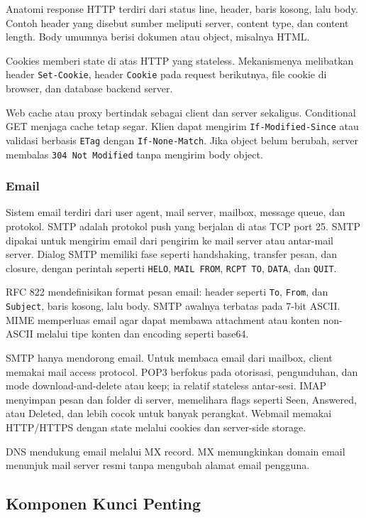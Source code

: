 Anatomi response HTTP terdiri dari status line, header, baris kosong, lalu body. Contoh header yang disebut sumber meliputi server, content type, dan content length. Body umumnya berisi dokumen atau object, misalnya HTML.

Cookies memberi state di atas HTTP yang stateless. Mekanismenya melibatkan header \texttt{Set-Cookie}, header \texttt{Cookie} pada request berikutnya, file cookie di browser, dan database backend server.

Web cache atau proxy bertindak sebagai client dan server sekaligus. Conditional GET menjaga cache tetap segar. Klien dapat mengirim \texttt{If-Modified-Since} atau validasi berbasis \texttt{ETag} dengan \texttt{If-None-Match}. Jika object belum berubah, server membalas \texttt{304 Not Modified} tanpa mengirim body object.

\subsubsection*{Email}

Sistem email terdiri dari user agent, mail server, mailbox, message queue, dan protokol. SMTP adalah protokol push yang berjalan di atas TCP port 25. SMTP dipakai untuk mengirim email dari pengirim ke mail server atau antar-mail server. Dialog SMTP memiliki fase seperti handshaking, transfer pesan, dan closure, dengan perintah seperti \texttt{HELO}, \texttt{MAIL FROM}, \texttt{RCPT TO}, \texttt{DATA}, dan \texttt{QUIT}.

RFC 822 mendefinisikan format pesan email: header seperti \texttt{To}, \texttt{From}, dan \texttt{Subject}, baris kosong, lalu body. SMTP awalnya terbatas pada 7-bit ASCII. MIME memperluas email agar dapat membawa attachment atau konten non-ASCII melalui tipe konten dan encoding seperti base64.

SMTP hanya mendorong email. Untuk membaca email dari mailbox, client memakai mail access protocol. POP3 berfokus pada otorisasi, pengunduhan, dan mode download-and-delete atau keep; ia relatif stateless antar-sesi. IMAP menyimpan pesan dan folder di server, memelihara flags seperti Seen, Answered, atau Deleted, dan lebih cocok untuk banyak perangkat. Webmail memakai HTTP/HTTPS dengan state melalui cookies dan server-side storage.

DNS mendukung email melalui MX record. MX memungkinkan domain email menunjuk mail server resmi tanpa mengubah alamat email pengguna.

\subsection{Komponen Kunci Penting}

